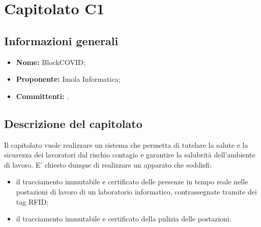 \section{Capitolato C1}

\subsection{Informazioni generali}
\begin{itemize}
\item \textbf{Nome:} BlockCOVID;
\item \textbf{Proponente:} Imola Informatica;
\item \textbf{Committenti:} \committenti{}.
\end{itemize}

\subsection{Descrizione del capitolato}
Il capitolato vuole realizzare un sistema che permetta di tutelare la salute e la sicurezza dei lavoratori dal rischio contagio e garantire la salubrità dell'ambiente di lavoro. E' chiesto dunque di realizzare un apparato che soddisfi:
\begin{itemize}
\item il tracciamento immutabile e certificato delle presenze in tempo reale nelle postazioni di lavoro di un laboratorio informatico, contrassegnate tramite dei tag RFID;
\item il tracciamento immutabile e certificato della pulizia delle postazioni.
\end{itemize}
